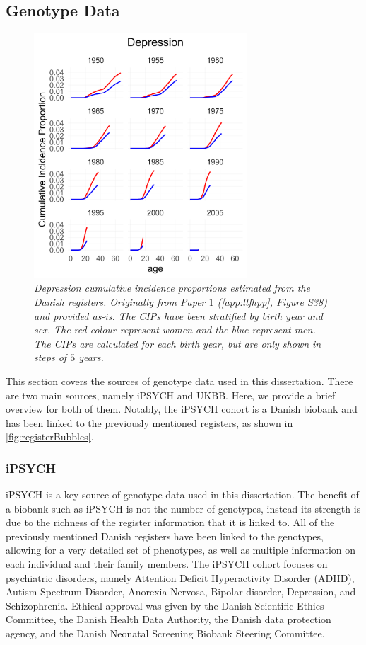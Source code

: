 \subsection{Genotype Data}
\begin{figure}
	\includegraphics[width=8cm]{methods/prevalencePlot_DEP.png}
	\caption[Cumulative incidence proportions from the Danish 
	Registers]{
		\sl Depression cumulative incidence proportions estimated from the Danish registers. Originally from Paper $ 1 $\cite{pedersen2022accounting} (\cref{app:ltfhpp}, Figure S38) and provided as-is. The CIPs have been stratified by birth year and sex. The red colour represent women and the blue represent men. The CIPs are calculated for each birth year, but are only shown in steps of $ 5 $ years.}
	\label{fig:CIP_DEP}
\end{figure}
This section covers the sources of genotype data used in this dissertation. There are two main sources, namely iPSYCH and UKBB. Here, we provide a brief overview for both of them. Notably, the iPSYCH cohort is a Danish biobank and has been linked to the previously mentioned registers, as shown in \cref{fig:registerBubbles}. 


\subsubsection{iPSYCH}

iPSYCH is a key source of genotype data used in this dissertation. The benefit of a biobank such as iPSYCH is not the number of genotypes, instead its strength is due to the richness of the register information that it is linked to. All of the previously mentioned Danish registers have been linked to the genotypes, allowing for a very detailed set of phenotypes, as well as multiple information on each individual and their family members. The iPSYCH cohort focuses on psychiatric disorders, namely Attention Deficit Hyperactivity Disorder (ADHD), Autism Spectrum Disorder, Anorexia Nervosa, Bipolar disorder, Depression, and Schizophrenia\cite{pedersen2018ipsych2012}. Ethical approval was given by the Danish Scientific Ethics Committee, the Danish Health Data Authority, the Danish data protection agency, and the Danish Neonatal Screening Biobank Steering Committee.

